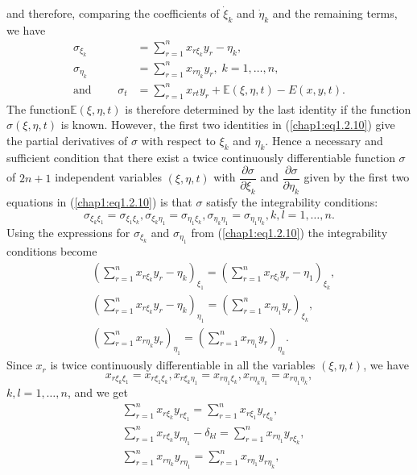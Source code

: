 and therefore, comparing the coefficients of $\dot{\xi}_k$ and $\dot{\eta}_k$ and the remaining terms, we have
\begin{align*}
\sigma_{\xi_k} & = \sum\limits^n_{r=1} x_{r\xi_k} y_r - \eta_k, \\
\sigma_{\eta_k} & = \sum\limits^n_{r=1} x_{r \eta_k} y_r, \; k = 1, \ldots, n, \tag{1.2.10}\label{chap1:eq1.2.10}\\
\text{and } \qquad \sigma_t & = \sum\limits^n_{r=1} x_{rt} y_r + \mathbb{E} (\xi, \eta, t) - E(x,y,t). 
\end{align*}
The function\pageoriginale $\mathbb{E}(\xi, \eta, t)$ is therefore determined by the last identity if the function $\sigma (\xi, \eta, t)$ is known. However, the first two identities in (\ref{chap1:eq1.2.10}) give the partial derivatives of $\sigma$ with respect to $\xi_k$ and $\eta_k$. Hence a necessary and sufficient condition that there exist a twice continuously differentiable function $\sigma$ of $2n+1$ independent variables $(\xi, \eta, t)$ with $\dfrac{\partial \sigma}{\partial \xi_k}$ and $\dfrac{\partial \sigma}{\partial \eta_k}$ given by the first two equations in (\ref{chap1:eq1.2.10}) is that $\sigma$ satisfy the integrability conditions:
$$
\sigma_{\xi_k \xi_1} = \sigma_{\xi_1 \xi_k} , \sigma_{\xi_k \eta_1} =\sigma_{\eta_1 \xi_k}, \sigma_{\eta_k \eta_1} = \sigma_{\eta_1 \eta_k}, k, l=1, \ldots, n. 
$$
Using the expressions for $\sigma_{\xi_k}$ and $\sigma_{\eta_1}$ from (\ref{chap1:eq1.2.10}) the integrability conditions become
\begin{align*}
& \left(\sum\limits^n_{r=1} x_{r\xi_k} y_r - \eta_k \right)_{\xi_1} = \left(\sum\limits^n_{r=1} x_{r\xi_l} y_r - \eta_1 \right)_{\xi_k},\\
& \left(\sum\limits^n_{r=1} x_{r\xi_k} y_r - \eta_k \right)_{\eta_1} = \left(\sum\limits^n_{r=1} x_{r\eta_1} y_r \right)_{\xi_k},\\
& \left(\sum\limits^n_{r=1} x_{r\eta_k} y_r \right)_{\eta_1} = \left(\sum\limits^n_{r=1} x_{r\eta_1} y_r \right)_{\eta_k}. 
\end{align*}
Since $x_r$ is twice continuously differentiable in all the variables $(\xi, \eta, t)$, we have 
$$
x_{r \xi_k \xi_1} = x_{r\xi_1 \xi_k}, x_{r\xi_k \eta_1} = x_{r\eta_1 \xi_k}, x_{r\eta_k \eta_1} = x_{r\eta_1 \eta_k},
$$
$k, l = 1, \ldots, n$, and we get 
\begin{align*}
& \sum\limits^n_{r=1} x_{r\xi_k} y_{r\xi_1} = \sum\limits^n_{r=1} x_{r\xi_1}  y_{r\xi_k}, \\
& \sum\limits^n_{r=1} x_{r\xi_k} y_{r\eta_1} - \delta_{kl} = \sum\limits^n_{r=1} x_{r\eta_1} y_{r\xi_k} , \tag{1.2.11}\label{chap1:eq1.2.11}\\
& \sum\limits^n_{r=1} x_{r\eta_k} y_{r\eta_1} = \sum\limits^n_{r=1} x_{r\eta_1} y_{r\eta_k}, 
\end{align*}\pageoriginale
